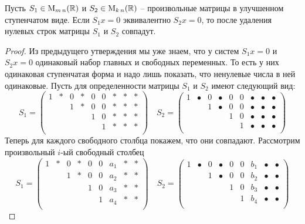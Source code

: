 \begin{claim}
\label{claim::UniqueRREF}
Пусть $S_1\in\operatorname{M}_{m\,n}(\mathbb R)$ и $S_2\in\operatorname{M}_{k\,n}(\mathbb R)$ -- произвольные матрицы в улучшенном ступенчатом виде.
Если $S_1x = 0$ эквивалентно $S_2x=0$, то после удаления нулевых строк матрицы $S_1$ и $S_2$ совпадут.
\end{claim}
\begin{proof}
Из предыдущего утверждения мы уже знаем, что у систем $S_1x = 0$ и $S_2 x = 0$ одинаковый набор главных и свободных переменных.
То есть у них одинаковая ступенчатая форма и надо лишь показать, что ненулевые числа в ней одинаковые.
Пусть для определенности матрицы $S_1$  и $S_2$ имеют следующий вид:
\[
S_1 = 
\begin{pmatrix}
{1}&{*}&{0}&{*}&{0}&{0}&{*}&{*}&{*}\\
{}&{}&{1}&{*}&{0}&{0}&{*}&{*}&{*}\\
{}&{}&{}&{}&{1}&{0}&{*}&{*}&{*}\\
{}&{}&{}&{}&{}&{1}&{*}&{*}&{*}\\
\end{pmatrix}\quad
S_2 = 
\begin{pmatrix}
{1}&{\bullet}&{0}&{\bullet}&{0}&{0}&{\bullet}&{\bullet}&{\bullet}\\
{}&{}&{1}&{\bullet}&{0}&{0}&{\bullet}&{\bullet}&{\bullet}\\
{}&{}&{}&{}&{1}&{0}&{\bullet}&{\bullet}&{\bullet}\\
{}&{}&{}&{}&{}&{1}&{\bullet}&{\bullet}&{\bullet}\\
\end{pmatrix}
\]
Теперь для каждого свободного столбца покажем, что они совпадают.
Рассмотрим произвольный $i$-ый свободный столбец
\[
S_1 = 
\begin{pmatrix}
{1}&{*}&{0}&{*}&{0}&{0}&{a_1}&{*}&{*}\\
{}&{}&{1}&{*}&{0}&{0}&{a_2}&{*}&{*}\\
{}&{}&{}&{}&{1}&{0}&{a_3}&{*}&{*}\\
{}&{}&{}&{}&{}&{1}&{a_4}&{*}&{*}\\
\end{pmatrix}\quad
S_2 = 
\begin{pmatrix}
{1}&{\bullet}&{0}&{\bullet}&{0}&{0}&{b_1}&{\bullet}&{\bullet}\\
{}&{}&{1}&{\bullet}&{0}&{0}&{b_2}&{\bullet}&{\bullet}\\
{}&{}&{}&{}&{1}&{0}&{b_3}&{\bullet}&{\bullet}\\
{}&{}&{}&{}&{}&{1}&{b_4}&{\bullet}&{\bullet}\\

\end{pmatrix}\]
\end{proof}
